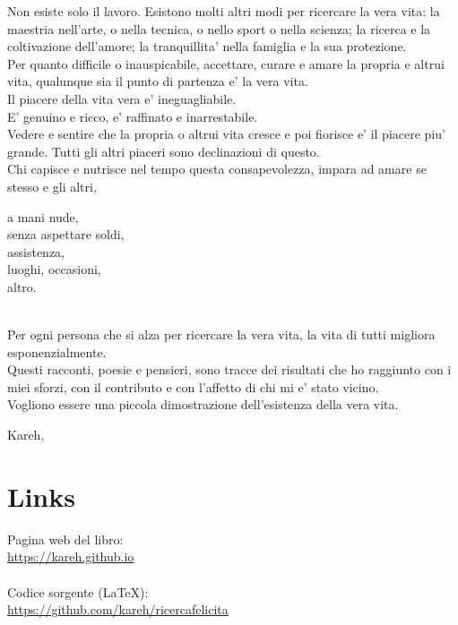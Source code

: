 Non esiste solo il lavoro. Esistono molti altri modi per ricercare la vera vita: la maestria nell'arte, o nella tecnica, o nello sport o nella scienza; la ricerca e la coltivazione dell'amore; la tranquillita' nella famiglia e la sua protezione.\\

Per quanto difficile o inauspicabile, accettare, curare e amare la propria e altrui vita, qualunque sia il punto di partenza e' la vera vita.\\

Il piacere della vita vera e' ineguagliabile.\\
E' genuino e ricco, e' raffinato e inarrestabile.\\

Vedere e sentire che la propria o altrui vita cresce e poi fiorisce e' il piacere piu' grande.
Tutti gli altri piaceri sono declinazioni di questo.\\

Chi capisce e nutrisce nel tempo questa consapevolezza, impara ad amare se stesso e gli altri,

\begin{poem}
a mani nude,\\
senza aspettare soldi,\\
assistenza,\\
luoghi, occasioni,\\
altro.\\
\end{poem}

\leavevmode\\
Per ogni persona che si alza per ricercare la vera vita,
la vita di tutti migliora esponenzialmente.\\

Questi racconti, poesie e pensieri, sono tracce dei risultati che ho raggiunto con i miei sforzi, con il contributo e con l'affetto di chi mi e' stato vicino.\\
Vogliono essere una piccola dimostrazione dell'esistenza della vera vita.

\begin{flushright}
    \vspace*{\fill}
    Kareh, \finishDate
\end{flushright}


\section{Links}

Pagina web del libro:\\
\url{https://kareh.github.io}\\

\leavevmode\\
Codice sorgente (LaTeX):\\
\url{https://github.com/kareh/ricercafelicita}

